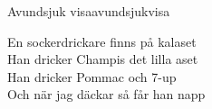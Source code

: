 \begin{song}{Avundsjuk visa}{avundsjukvisa}
\begin{vers}
En sockerdrickare finns på kalaset\\
Han dricker Champis det lilla aset\\
Han dricker Pommac och 7-up\\
Och när jag däckar så får han napp\\
\end{vers}
\end{song}
